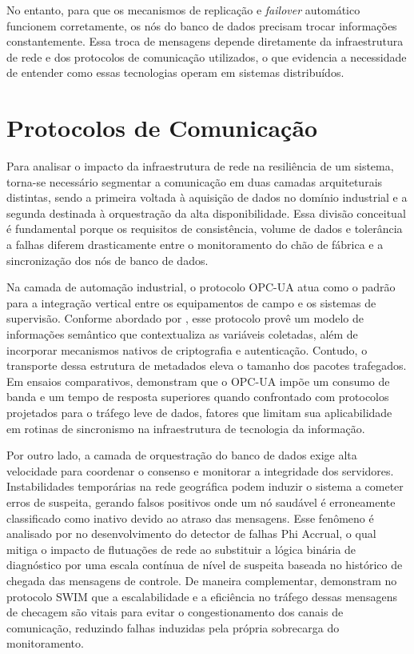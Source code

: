     No entanto, para que os mecanismos de replicação e \textit{failover} automático funcionem corretamente, os nós do banco de dados precisam trocar informações constantemente. Essa troca de mensagens depende diretamente da infraestrutura de rede e dos protocolos de comunicação utilizados, o que evidencia a necessidade de entender como essas tecnologias operam em sistemas distribuídos.

\section{Protocolos de Comunicação}

    Para analisar o impacto da infraestrutura de rede na resiliência de um sistema, torna-se necessário segmentar a comunicação em duas camadas arquiteturais distintas, sendo a primeira voltada à aquisição de dados no domínio industrial e a segunda destinada à orquestração da alta disponibilidade. Essa divisão conceitual é fundamental porque os requisitos de consistência, volume de dados e tolerância a falhas diferem drasticamente entre o monitoramento do chão de fábrica e a sincronização dos nós de banco de dados.

    Na camada de automação industrial, o protocolo OPC-UA atua como o padrão para a integração vertical entre os equipamentos de campo e os sistemas de supervisão. Conforme abordado por , esse protocolo provê um modelo de informações semântico que contextualiza as variáveis coletadas, além de incorporar mecanismos nativos de criptografia e autenticação. Contudo, o transporte dessa estrutura de metadados eleva o tamanho dos pacotes trafegados. Em ensaios comparativos,  demonstram que o OPC-UA impõe um consumo de banda e um tempo de resposta superiores quando confrontado com protocolos projetados para o tráfego leve de dados, fatores que limitam sua aplicabilidade em rotinas de sincronismo na infraestrutura de tecnologia da informação.

    Por outro lado, a camada de orquestração do banco de dados exige alta velocidade para coordenar o consenso e monitorar a integridade dos servidores. Instabilidades temporárias na rede geográfica podem induzir o sistema a cometer erros de suspeita, gerando falsos positivos onde um nó saudável é erroneamente classificado como inativo devido ao atraso das mensagens. Esse fenômeno é analisado por  no desenvolvimento do detector de falhas Phi Accrual, o qual mitiga o impacto de flutuações de rede ao substituir a lógica binária de diagnóstico por uma escala contínua de nível de suspeita baseada no histórico de chegada das mensagens de controle. De maneira complementar,  demonstram no protocolo SWIM que a escalabilidade e a eficiência no tráfego dessas mensagens de checagem são vitais para evitar o congestionamento dos canais de comunicação, reduzindo falhas induzidas pela própria sobrecarga do monitoramento.

